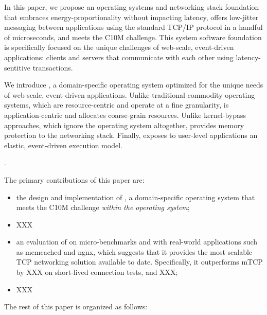 In this paper, we propose an operating systems and networking stack
foundation that embraces energy-proportionality without impacting
latency, offers low-jitter messaging between applications using the
standard TCP/IP protocol in a handful of microseconds, and meets the
C10M challenge.  This system software foundation is specifically
focused on the unique challenges of web-scale, event-driven
applications: clients and servers that communicate with each other
using latency-sentitive transactions.


We introduce \ix, a domain-specific operating system optimized for the
unique needs of web-scale, event-driven applications.  Unlike
traditional commodity operating systems, which are resource-centric
and operate at a fine granularity, \ix is application-centric and
allocates coarse-grain resources.  Unlike kernel-bypass approaches,
which ignore the operating system altogether, \ix provides memory
protection to the networking stack.  Finally, \ix exposes to user-level
applications an elastic, event-driven execution model.

.  


The primary contributions of this paper are:

\begin{itemize}

\item the design and implementation of \ix, a domain-specific
  operating system that meets the C10M challenge \emph{within the
    operating system};

\item XXX

\item an evaluation of \ix on micro-benchmarks and with real-world
  applications such as memcached and ngnx, which suggests that it
  provides the most scalable TCP networking solution available to
  date.  Specifically, it outperforms mTCP by XXX on short-lived
  connection tests, and XXX;

\item XXX

\end{itemize}


The rest of this paper is organized as follows: 





